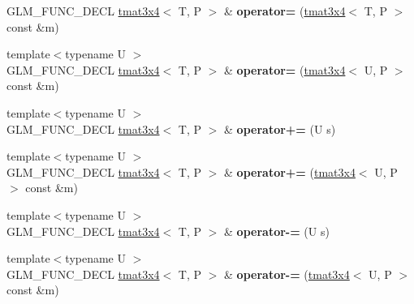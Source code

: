 \begin{DoxyCompactItemize}
\item 
G\+L\+M\+\_\+\+F\+U\+N\+C\+\_\+\+D\+E\+CL \hyperlink{structglm_1_1detail_1_1tmat3x4}{tmat3x4}$<$ T, P $>$ \& {\bfseries operator=} (\hyperlink{structglm_1_1detail_1_1tmat3x4}{tmat3x4}$<$ T, P $>$ const \&m)\hypertarget{structglm_1_1detail_1_1tmat3x4_a235b6fc15047de1d9415b3e1027bc2e4}{}\label{structglm_1_1detail_1_1tmat3x4_a235b6fc15047de1d9415b3e1027bc2e4}

\item 
{\footnotesize template$<$typename U $>$ }\\G\+L\+M\+\_\+\+F\+U\+N\+C\+\_\+\+D\+E\+CL \hyperlink{structglm_1_1detail_1_1tmat3x4}{tmat3x4}$<$ T, P $>$ \& {\bfseries operator=} (\hyperlink{structglm_1_1detail_1_1tmat3x4}{tmat3x4}$<$ U, P $>$ const \&m)\hypertarget{structglm_1_1detail_1_1tmat3x4_a3e6b142f80982e1d1722f75a6d146090}{}\label{structglm_1_1detail_1_1tmat3x4_a3e6b142f80982e1d1722f75a6d146090}

\item 
{\footnotesize template$<$typename U $>$ }\\G\+L\+M\+\_\+\+F\+U\+N\+C\+\_\+\+D\+E\+CL \hyperlink{structglm_1_1detail_1_1tmat3x4}{tmat3x4}$<$ T, P $>$ \& {\bfseries operator+=} (U s)\hypertarget{structglm_1_1detail_1_1tmat3x4_ab57d6efb45e4b2e6fd77a12486c4daa8}{}\label{structglm_1_1detail_1_1tmat3x4_ab57d6efb45e4b2e6fd77a12486c4daa8}

\item 
{\footnotesize template$<$typename U $>$ }\\G\+L\+M\+\_\+\+F\+U\+N\+C\+\_\+\+D\+E\+CL \hyperlink{structglm_1_1detail_1_1tmat3x4}{tmat3x4}$<$ T, P $>$ \& {\bfseries operator+=} (\hyperlink{structglm_1_1detail_1_1tmat3x4}{tmat3x4}$<$ U, P $>$ const \&m)\hypertarget{structglm_1_1detail_1_1tmat3x4_ac18c19db6f4e348c972e9f937522eaca}{}\label{structglm_1_1detail_1_1tmat3x4_ac18c19db6f4e348c972e9f937522eaca}

\item 
{\footnotesize template$<$typename U $>$ }\\G\+L\+M\+\_\+\+F\+U\+N\+C\+\_\+\+D\+E\+CL \hyperlink{structglm_1_1detail_1_1tmat3x4}{tmat3x4}$<$ T, P $>$ \& {\bfseries operator-\/=} (U s)\hypertarget{structglm_1_1detail_1_1tmat3x4_a9bfae7f6a40560de9392ba57cd2edff5}{}\label{structglm_1_1detail_1_1tmat3x4_a9bfae7f6a40560de9392ba57cd2edff5}

\item 
{\footnotesize template$<$typename U $>$ }\\G\+L\+M\+\_\+\+F\+U\+N\+C\+\_\+\+D\+E\+CL \hyperlink{structglm_1_1detail_1_1tmat3x4}{tmat3x4}$<$ T, P $>$ \& {\bfseries operator-\/=} (\hyperlink{structglm_1_1detail_1_1tmat3x4}{tmat3x4}$<$ U, P $>$ const \&m)\hypertarget{structglm_1_1detail_1_1tmat3x4_aa8d0e590eec95fd09194f038dd349e34}{}\label{structglm_1_1detail_1_1tmat3x4_aa8d0e590eec95fd09194f038dd349e34}


\end{DoxyCompactItemize}
